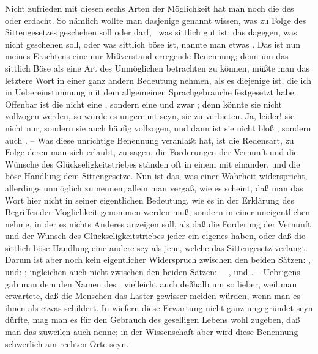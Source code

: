 \begin{aufza}
\begin{RWanm}
Nicht zufrieden mit diesen sechs Arten der Möglichkeit hat man noch die des  oder  erdacht. So nämlich wollte man dasjenige genannt wissen, was zu Folge des Sittengesetzes geschehen soll oder darf, \dh\ was sittlich gut ist; das dagegen, was nicht geschehen soll, oder was sittlich böse ist, nannte man etwas . Das ist nun meines Erachtens eine nur Mißverstand erregende Benennung; denn um das sittlich Böse als eine Art des Unmöglichen betrachten zu können, müßte man das letztere Wort in einer ganz andern Bedeutung nehmen, als es diejenige ist, die ich in Uebereinstimmung mit dem allgemeinen Sprachgebrauche festgesetzt habe. Offenbar ist die  nicht eine , sondern eine und zwar ; denn könnte sie nicht vollzogen werden, so würde es ungereimt seyn, sie zu verbieten. Ja, leider!  sie nicht nur, sondern sie  auch häufig vollzogen, und dann ist sie nicht bloß , sondern auch . -- Was diese unrichtige Benennung veranlaßt hat, ist die Redensart, zu Folge deren man sich erlaubt, zu sagen, die Forderungen der Vernunft und die Wünsche des Glückseligkeitstriebes ständen oft in einem  mit einander, und die böse Handlung  dem Sittengesetze. Nun ist das, was einer Wahrheit widerspricht, allerdings unmöglich zu nennen; allein man vergaß, wie es scheint, daß man das Wort  hier nicht in seiner eigentlichen Bedeutung, wie es in der Erklärung des Begriffes der Möglichkeit genommen werden muß, sondern in einer uneigentlichen nehme, in der es nichts Anderes anzeigen soll, als daß die Forderung der Vernunft und der Wunsch des Glückseligkeitstriebes jeder ein eigenes  haben, oder daß die sittlich böse Handlung eine andere sey als jene, welche das Sittengesetz verlangt. Darum ist aber noch kein eigentlicher Widerspruch zwischen den beiden Sätzen: , und: ; ingleichen auch nicht zwischen den beiden Sätzen: ~\ , und . -- Uebrigens gab man dem  den Namen des , vielleicht auch deßhalb um so lieber, weil man erwartete, daß die Menschen das Laster gewisser meiden würden, wenn man es ihnen als etwas  schildert. In wiefern diese Erwartung nicht ganz ungegründet seyn dürfte, mag man es für den Gebrauch des geselligen Lebens wohl zugeben, daß man das  zuweilen auch  nenne; in der Wissenschaft aber wird diese Benennung schwerlich am rechten Orte seyn. 
\end{RWanm}
\end{aufza}
   
